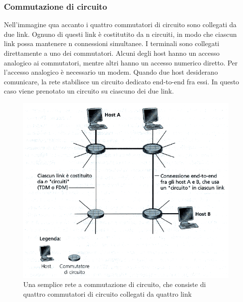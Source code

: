 \documentclass[11pt,a4paper]{article}
\begin{document}
\subsubsection{Commutazione di circuito}
Nell’immagine qua accanto i quattro commutatori di circuito sono collegati da due link. Ognuno di questi link è costitutito da n circuiti, in modo che ciascun link possa mantenere n connessioni simultanee.
I terminali sono collegati direttamente a uno dei commutatori. Alcuni degli host hanno un accesso analogico ai commutatori, mentre altri hanno un accesso numerico diretto. Per l’accesso analogico è necessario un modem. Quando due host desiderano comunicare, la rete stabilisce un circuito dedicato end-to-end fra essi. In questo caso viene prenotato un circuito su ciascuno dei due link.
\begin{figure}
	\includegraphics[scale=0.6]{img/002.png}
	\caption{Una semplice rete a commutazione di circuito, che consiste di quattro commutatori di circuito collegati da quattro link}
\end{figure}
\end{document}
